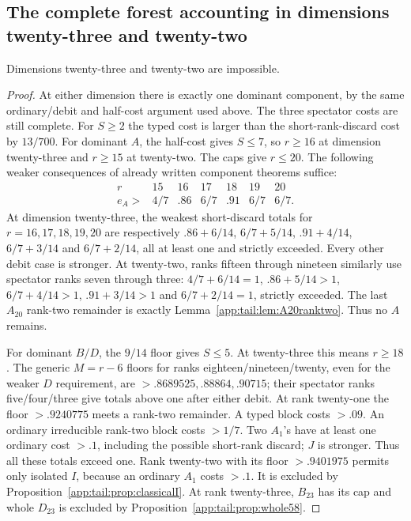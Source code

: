 \subsection{The complete forest accounting in dimensions twenty-three and twenty-two}
\label{app:tail:23and22}
\begin{proposition}
\label{app:tail:prop:23and22}
Dimensions twenty-three and twenty-two are impossible.
\end{proposition}
\begin{proof}
At either dimension there is exactly one dominant component, by the
same ordinary/debit and half-cost argument used above. The three
spectator costs are still complete. For $S\ge2$ the typed cost is
larger than the short-rank-discard cost by $13/700$.
For dominant $A$, the half-cost gives $S\le7$, so $r\ge16$ at
dimension twenty-three and $r\ge15$ at twenty-two. The caps give
$r\le20$. The following weaker consequences of already written
component theorems suffice:
\[
\begin{array}{c|cccccc}
r&15&16&17&18&19&20\\ \hline
e_A>&4/7&.86&6/7&.91&6/7&6/7.
\end{array}
\]
At dimension twenty-three, the weakest short-discard totals for
$r=16,17,18,19,20$ are respectively
$ .86+6/14$, $6/7+5/14$, $.91+4/14$, $6/7+3/14$ and
$6/7+2/14$, all at least one and strictly exceeded. Every other
debit case is stronger. At twenty-two, ranks fifteen through
nineteen similarly use spectator ranks seven through three:
$4/7+6/14=1$, $.86+5/14>1$, $6/7+4/14>1$,
$.91+3/14>1$ and $6/7+2/14=1$, strictly exceeded.
The last $A_{20}$ rank-two remainder is exactly
Lemma~\ref{app:tail:lem:A20ranktwo}. Thus no $A$ remains.

For dominant $B/D$, the $9/14$ floor gives $S\le5$.
At twenty-three this means $r\ge18$. The generic $M=r-6$
floors for ranks eighteen/nineteen/twenty, even for the weaker $D$
requirement, are $>.8689525,.88864,.90715$; their spectator ranks
five/four/three give totals above one after either debit.
At rank twenty-one the floor $>.9240775$ meets a rank-two remainder.
A typed block costs $>.09$. An ordinary irreducible rank-two block
costs $>1/7$. Two $A_1$'s have at least one ordinary cost $>.1$,
including the possible short-rank discard; $J$ is stronger. Thus all
these totals exceed one. Rank twenty-two with its floor $>.9401975$
permits only isolated $I$, because an ordinary $A_1$ costs $>.1$.
It is excluded by Proposition~\ref{app:tail:prop:classicalI}.
At rank twenty-three, $B_{23}$ has its cap and whole $D_{23}$ is
excluded by Proposition~\ref{app:tail:prop:whole58}.


\end{proof}
